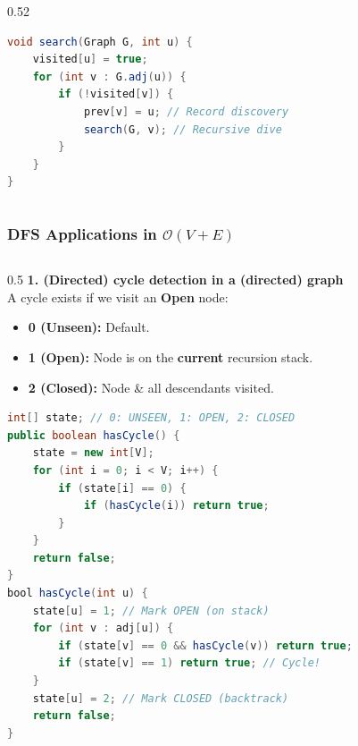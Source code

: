 \documentclass[8pt,aspectratio=169]{beamer}
\begin{document}
\begin{frame}[t, fragile]
\begin{columns}[T]
\begin{column}{0.52\textwidth}
\begin{lstlisting}[language=Java, basicstyle=\tiny\ttfamily, keywordstyle=\color{blue}, frame=single, title=DFS(Graph G\, Source s)]
void search(Graph G, int u) {
    visited[u] = true;
    for (int v : G.adj(u)) {
        if (!visited[v]) {
            prev[v] = u; // Record discovery
            search(G, v); // Recursive dive
        }
    }
}
\end{lstlisting}
    \end{column}
\end{columns}
\end{frame}



\begin{frame}[t, fragile]
\frametitle{DFS Applications in $\mathcal{O}(V+E)$}
\begin{columns}[T]
    \begin{column}{0.5\textwidth}
        \textbf{1. (Directed) cycle detection in a (directed) graph}\\
        A cycle exists if we visit an \textbf{Open} node:
        \begin{itemize}
                    \item \textbf{0 (Unseen):} Default.
                    \item \textbf{1 (Open):} Node is on the \textbf{current} recursion stack.
                    \item \textbf{2 (Closed):} Node \& all descendants visited.
        \end{itemize}
\begin{lstlisting}[language=Java, basicstyle=\tiny\ttfamily, keywordstyle=\color{blue}, frame=single]
int[] state; // 0: UNSEEN, 1: OPEN, 2: CLOSED
public boolean hasCycle() {
    state = new int[V]; 
    for (int i = 0; i < V; i++) {
        if (state[i] == 0) {
            if (hasCycle(i)) return true;
        }
    }
    return false;
}
bool hasCycle(int u) {
    state[u] = 1; // Mark OPEN (on stack)
    for (int v : adj[u]) {
        if (state[v] == 0 && hasCycle(v)) return true;
        if (state[v] == 1) return true; // Cycle!
    }
    state[u] = 2; // Mark CLOSED (backtrack)
    return false;
}
        \end{lstlisting}
    \end{column}


\end{columns}
\end{frame}
\end{document}
